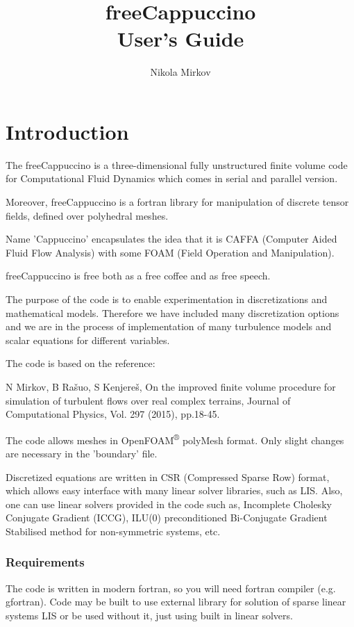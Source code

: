 \documentclass[11pt,a4paper]{report}
\author{Nikola Mirkov}
\title{{\Huge freeCappuccino} \\ User's Guide}
\begin{document}
\maketitle

\chapter{Introduction}

The freeCappuccino is a three-dimensional fully unstructured finite volume code for Computational Fluid Dynamics which comes in serial and parallel version.

Moreover, freeCappuccino is a fortran library for manipulation of discrete tensor fields, defined over polyhedral meshes.

Name 'Cappuccino' encapsulates the idea that it is CAFFA (Computer Aided Fluid Flow Analysis) with some FOAM (Field Operation and Manipulation).

freeCappuccino is free both as a free coffee and as free speech.


The purpose of the code is to enable experimentation in discretizations and mathematical models. Therefore we have included many discretization options and we are in the process of implementation of many turbulence models and scalar equations for different variables.

The code is based on the reference:

N Mirkov, B Rašuo, S Kenjereš, On the improved finite volume procedure for simulation of turbulent flows over real complex terrains, Journal of Computational Physics, Vol. 297 (2015), pp.18-45.

The code allows meshes in OpenFOAM\textsuperscript{®} polyMesh format. Only slight changes are necessary in the 'boundary' file.

Discretized equations are written in CSR (Compressed Sparse Row) format, which allows easy interface with many linear solver libraries, such as LIS. Also, one can use linear solvers provided in the code such as, Incomplete Cholesky Conjugate Gradient (ICCG), ILU(0) preconditioned Bi-Conjugate Gradient Stabilised method for non-symmetric systems, etc.

\subsection{Requirements}

The code is written in modern fortran, so you will need fortran compiler (e.g. gfortran). Code may be built to use external library for solution of sparse linear systems LIS or be used without it, just using built in linear solvers.
\end{document}
